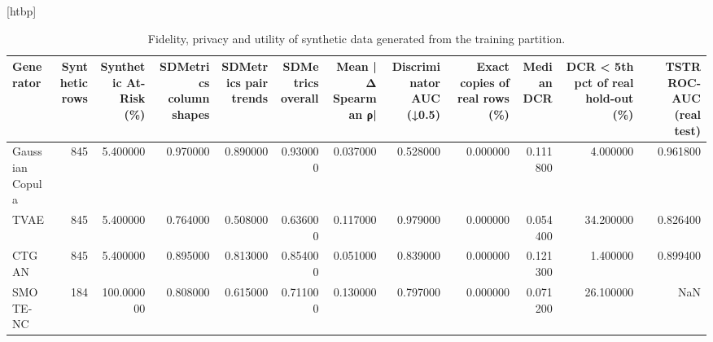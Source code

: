 \begin{table}
\small[htbp]
\caption{Fidelity, privacy and utility of synthetic data generated from the training partition.}
\label{tab:S18_synthetic_fidelity_privacy}
\begin{tabular}{lrrrrrrrrrrr}
\toprule
Generator & Synthetic rows & Synthetic At-Risk (\%) & SDMetrics column shapes & SDMetrics pair trends & SDMetrics overall & Mean |Δ Spearman ρ| & Discriminator AUC (↓0.5) & Exact copies of real rows (\%) & Median DCR & DCR < 5th pct of real hold-out (\%) & TSTR ROC-AUC (real test) \\
\midrule
Gaussian Copula & 845 & 5.400000 & 0.970000 & 0.890000 & 0.930000 & 0.037000 & 0.528000 & 0.000000 & 0.111800 & 4.000000 & 0.961800 \\
TVAE & 845 & 5.400000 & 0.764000 & 0.508000 & 0.636000 & 0.117000 & 0.979000 & 0.000000 & 0.054400 & 34.200000 & 0.826400 \\
CTGAN & 845 & 5.400000 & 0.895000 & 0.813000 & 0.854000 & 0.051000 & 0.839000 & 0.000000 & 0.121300 & 1.400000 & 0.899400 \\
SMOTE-NC & 184 & 100.000000 & 0.808000 & 0.615000 & 0.711000 & 0.130000 & 0.797000 & 0.000000 & 0.071200 & 26.100000 & NaN \\
\bottomrule
\end{tabular}
\end{table}
